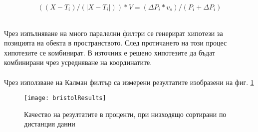 \centerline{\begin{equation} \label{kalman}
    ((X-T_i)/ (|X-T_i|)) * V = (\Delta P_i * v_s) / (P_i + \Delta P_i)
\end{equation}}\\

Чрез изпълняване на много паралелни филтри се генерират хипотези за позицията на обекта в пространството. След протичането на този процес хипотезите се комбинират. В източник \cite{bristolBeacons} е решено хипотезите да бъдат комбинирани чрез усредняване на координатите. \\


 \\
Чрез използване на Калман филтър са измерени резултатите изобразени на фиг. \ref{fig:bristolResults}

\begin{figure}
    \centering
    \centerline{\texttt{[image: bristolResults]}}
    \caption{Качество на резултатите в проценти, при низходящо сортирани по дистанция данни}
    \label{fig:bristolResults}
\end{figure}